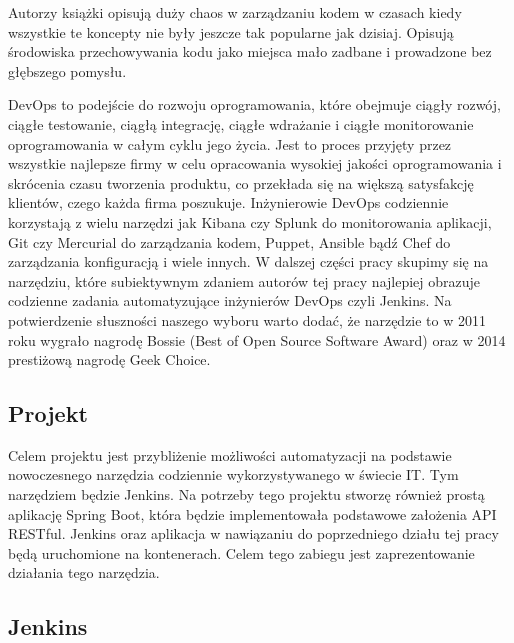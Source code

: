 Autorzy książki opisują duży chaos w zarządzaniu kodem w czasach kiedy wszystkie te koncepty nie były jeszcze tak popularne jak dzisiaj. Opisują środowiska przechowywania kodu jako miejsca mało zadbane i prowadzone bez głębszego pomysłu.

DevOps to podejście do rozwoju oprogramowania, które obejmuje ciągły rozwój, ciągłe testowanie, ciągłą integrację, ciągłe wdrażanie i ciągłe monitorowanie oprogramowania w całym cyklu jego życia. Jest to proces przyjęty przez wszystkie najlepsze firmy w celu opracowania wysokiej jakości oprogramowania i skrócenia czasu tworzenia produktu, co przekłada się na większą satysfakcję klientów, czego każda firma poszukuje.
Inżynierowie DevOps codziennie korzystają z wielu narzędzi jak Kibana czy Splunk do monitorowania aplikacji, Git czy Mercurial do zarządzania kodem, Puppet, Ansible bądź Chef do zarządzania konfiguracją i wiele innych. 
W dalszej części pracy skupimy się na narzędziu, które subiektywnym zdaniem autorów tej pracy najlepiej obrazuje codzienne zadania automatyzujące inżynierów DevOps czyli Jenkins.
Na potwierdzenie słuszności naszego wyboru warto dodać, że narzędzie to w 2011 roku wygrało nagrodę Bossie (Best of Open Source Software Award) oraz w 2014 prestiżową nagrodę Geek Choice.  

\subsection{Projekt}

Celem projektu jest przybliżenie możliwości automatyzacji na podstawie nowoczesnego narzędzia codziennie wykorzystywanego w świecie IT. Tym narzędziem będzie Jenkins. 
Na potrzeby tego projektu stworzę również prostą aplikację Spring Boot, która będzie implementowała podstawowe założenia API RESTful. Jenkins oraz aplikacja w nawiązaniu do poprzedniego działu tej pracy będą uruchomione na kontenerach. Celem tego zabiegu jest zaprezentowanie działania tego narzędzia. 

\subsection{Jenkins}

